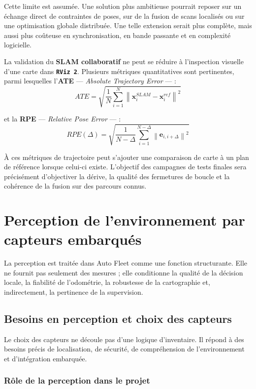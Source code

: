 \documentclass[11pt,a4paper]{report}
\newcommand{\kw}[1]{\textbf{#1}}
\newcommand{\outil}[1]{\textbf{\texttt{#1}}}
\begin{document}
Cette limite est assumée. Une solution plus ambitieuse pourrait reposer sur un échange direct de contraintes de poses, sur de la fusion de scans localisés ou sur une optimisation globale distribuée. Une telle extension serait plus complète, mais aussi plus coûteuse en synchronisation, en bande passante et en complexité logicielle.

La validation du \kw{SLAM collaboratif} ne peut se réduire à l’inspection visuelle d’une carte dans \outil{RViz 2}. Plusieurs métriques quantitatives sont pertinentes, parmi lesquelles l’\kw{ATE} --- \textit{Absolute Trajectory Error} --- :
\[
ATE =
\sqrt{
\frac{1}{N}
\sum_{i=1}^{N}
\left\|
\mathbf{x}_i^{SLAM}
-
\mathbf{x}_i^{ref}
\right\|^2
}
\]

et la \kw{RPE} --- \textit{Relative Pose Error} --- :
\[
RPE(\Delta) =
\sqrt{
\frac{1}{N-\Delta}
\sum_{i=1}^{N-\Delta}
\left\|
\mathbf{e}_{i,i+\Delta}
\right\|^2
}
\]

À ces métriques de trajectoire peut s’ajouter une comparaison de carte à un plan de référence lorsque celui-ci existe. L’objectif des campagnes de tests finales sera précisément d’objectiver la dérive, la qualité des fermetures de boucle et la cohérence de la fusion sur des parcours connus.

\chapter{Perception de l’environnement par capteurs embarqués}

La perception est traitée dans Auto Fleet comme une fonction structurante. Elle ne fournit pas seulement des mesures ; elle conditionne la qualité de la décision locale, la fiabilité de l’odométrie, la robustesse de la cartographie et, indirectement, la pertinence de la supervision.

\section{Besoins en perception et choix des capteurs}

Le choix des capteurs ne découle pas d’une logique d’inventaire. Il répond à des besoins précis de localisation, de sécurité, de compréhension de l’environnement et d’intégration embarquée.

\subsection{Rôle de la perception dans le projet}
\end{document}
